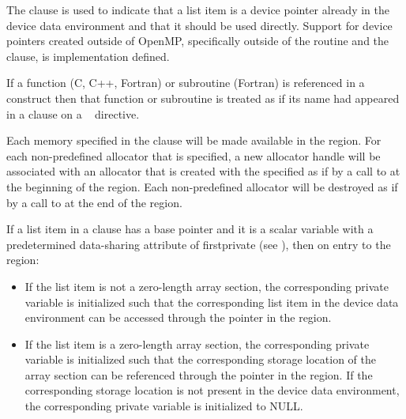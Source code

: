 The  clause is used to indicate that a list item is a device
pointer already in the device data environment and that it should be used
directly.  Support for device pointers created outside of OpenMP, specifically
outside of the  routine and the  clause,
is implementation defined.

If a function (C, C++, Fortran) or subroutine (Fortran) is referenced in a
 construct then that function or subroutine is treated as if its
name had appeared in a  clause on a ~
directive.

Each memory  specified in the  clause will 
be made available in the  region. For each non-predefined allocator 
that is specified, a new allocator handle will be associated with an allocator 
that is created with the specified  as if by a call to 
 at the beginning of the  region. Each 
non-predefined allocator will be destroyed as if by a call to 
 at the end of the  region.

\begin{ccppspecific}

If a list item in a  clause has a base pointer and it is a
scalar variable with a predetermined data-sharing attribute of firstprivate
(see ), then on entry 
to the  region:

\begin{itemize}
\item If the list item is not a zero-length array section, the corresponding
private variable is initialized such that the corresponding list item in the
device data environment can be accessed through the pointer in the
 region.

\item If the list item is a zero-length array section, the corresponding
private variable is initialized such that the corresponding storage location
of the array section can be referenced through the pointer in the 
region. If the corresponding storage location is not present in the device
data environment, the corresponding private variable is initialized to NULL.
\end{itemize}

\end{ccppspecific}

